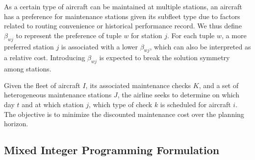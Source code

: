 As a certain type of aircraft can be maintained at multiple stations, an aircraft has a preference for maintenance stations given its subfleet type due to factors related to routing convenience or historical performance record.  We thus define $\beta_{wj}$ to represent the preference of tuple $w$ for station $j$. For each tuple $w$, a more preferred station $j$ is associated with a lower $\beta_{wj}$, which can also be interpreted as a relative cost. Introducing $\beta_{wj}$ is expected to break the solution symmetry among stations. 

 
Given the fleet of aircraft $I$, its associated maintenance checks $K$, and a set of heterogeneous maintenance stations $J$, the airline seeks to determine on which day $t$ and at which station $j$, which type of check $k$ is scheduled for aircraft $i$. The objective is to minimize the discounted maintenance cost over the planning horizon. 
 

\subsection{Mixed Integer Programming Formulation}
\label{subsec:MIP_formulation}

